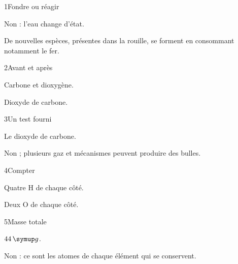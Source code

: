 \par\noindent\begin{minipage}{\linewidth}
\begin{corrige}{1}{Fondre ou réagir}
\begin{questions}
\item Non : l’eau change d’état.
\item De nouvelles espèces, présentes dans la rouille, se forment en consommant notamment le fer.
\end{questions}
\end{corrige}
\end{minipage}
\par\noindent\begin{minipage}{\linewidth}
\begin{corrige}{2}{Avant et après}
\begin{questions}
\item Carbone et dioxygène.
\item Dioxyde de carbone.
\end{questions}
\end{corrige}
\end{minipage}
\par\noindent\begin{minipage}{\linewidth}
\begin{corrige}{3}{Un test fourni}
\begin{questions}
\item Le dioxyde de carbone.
\item Non ; plusieurs gaz et mécanismes peuvent produire des bulles.
\end{questions}
\end{corrige}
\end{minipage}
\par\noindent\begin{minipage}{\linewidth}
\begin{corrige}{4}{Compter}
\begin{questions}
\item Quatre H de chaque côté.
\item Deux O de chaque côté.
\end{questions}
\end{corrige}
\end{minipage}
\par\noindent\begin{minipage}{\linewidth}
\begin{corrige}{5}{Masse totale}
\begin{questions}
\item $44\unite g$.
\item Non : ce sont les atomes de chaque élément qui se conservent.
\end{questions}
\end{corrige}
\end{minipage}
